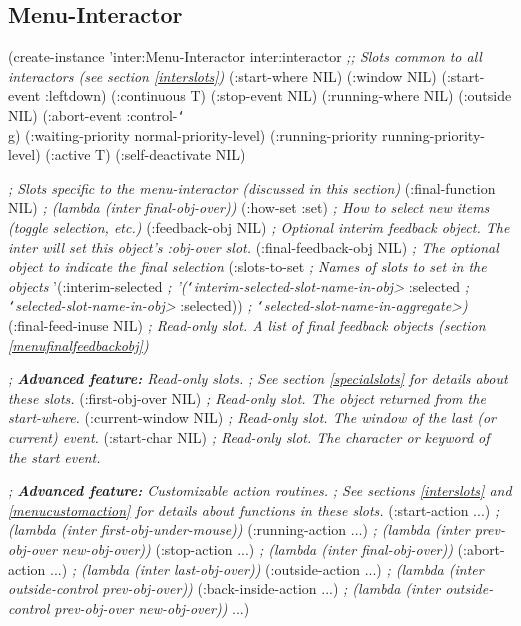 \begin{group}
\section{Menu-Interactor}
\label{MENUINTER}
\begin{programexample}
(create-instance 'inter:Menu-Interactor inter:interactor
  {\it ;; Slots common to all interactors (see section \ref{interslots})}
  (:start-where NIL)
  (:window NIL)
  (:start-event :leftdown)
  (:continuous T)
  (:stop-event NIL)
  (:running-where NIL)
  (:outside NIL)
  (:abort-event :control-{\tt\char`\\}g)
  (:waiting-priority normal-priority-level)
  (:running-priority running-priority-level)
  (:active T)
  (:self-deactivate NIL)

  {\it ; Slots specific to the menu-interactor (discussed in this section)}
  (:final-function NIL)      {\it ; (lambda (inter final-obj-over))}
  (:how-set :set)            {\it ; How to select new items (toggle selection, etc.)}
  (:feedback-obj NIL)        {\it ; Optional interim feedback object.  The inter will set this object's :obj-over slot.}
  (:final-feedback-obj NIL)  {\it ; The optional object to indicate the final selection}
  (:slots-to-set             {\it ; Names of slots to set in the objects}
   '(:interim-selected       {\it ;   '({\tt\char`\<}interim-selected-slot-name-in-obj>}
     :selected               {\it ;     {\tt\char`\<}selected-slot-name-in-obj>}
     :selected))             {\it ;     {\tt\char`\<}selected-slot-name-in-aggregate>)}
  (:final-feed-inuse NIL)    {\it ; Read-only slot.  A list of final feedback objects (section \ref{menufinalfeedbackobj})}

  {\it ; {\bf Advanced feature:}  Read-only slots.}
  {\it ; See section \ref{specialslots} for details about these slots.}
  (:first-obj-over NIL)     {\it ; Read-only slot.  The object returned from the start-where.}
  (:current-window NIL)     {\it ; Read-only slot.  The window of the last (or current) event.}
  (:start-char NIL)         {\it ; Read-only slot.  The character or keyword of the start event.}

  {\it ; {\bf Advanced feature:} Customizable action routines.}
  {\it ; See sections \ref{interslots} and \ref{menucustomaction} for details about functions in these slots.}
  (:start-action ...)       {\it ; (lambda (inter first-obj-under-mouse))}
  (:running-action ...)     {\it ; (lambda (inter prev-obj-over new-obj-over))}
  (:stop-action ...)        {\it ; (lambda (inter final-obj-over))}
  (:abort-action ...)       {\it ; (lambda (inter last-obj-over))}
  (:outside-action ...)     {\it ; (lambda (inter outside-control prev-obj-over))}
  (:back-inside-action ...) {\it ; (lambda (inter outside-control prev-obj-over new-obj-over))}
...)
\end{programexample}
\end{group}

